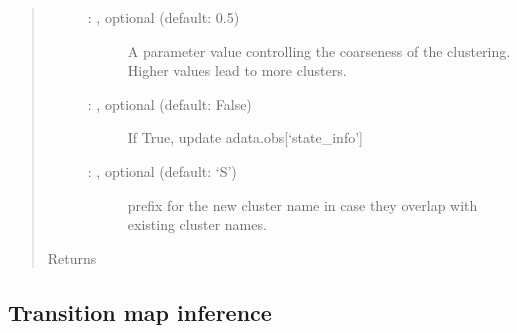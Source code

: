\documentclass[letterpaper,10pt,english]{sphinxmanual}
\begin{document}
\begin{fulllineitems}
\begin{quote}
\begin{description}
\begin{description}
\item[{ : , optional (default: 0.5)}] \leavevmode
A parameter value controlling the coarseness of the clustering.
Higher values lead to more clusters.

\item[{ : , optional (default: False)}] \leavevmode
If True, update adata.obs{[}‘state\_info’{]}

\item[{ : , optional (default: ‘S’)}] \leavevmode
prefix for the new cluster name in case they overlap
with existing cluster names.

\end{description}

\item[{Returns}] \leavevmode
{}

\end{description}\end{quote}

\end{fulllineitems}



\subsection{Transition map inference}
\label{\detokenize{api:transition-map-inference}}
\end{document}
